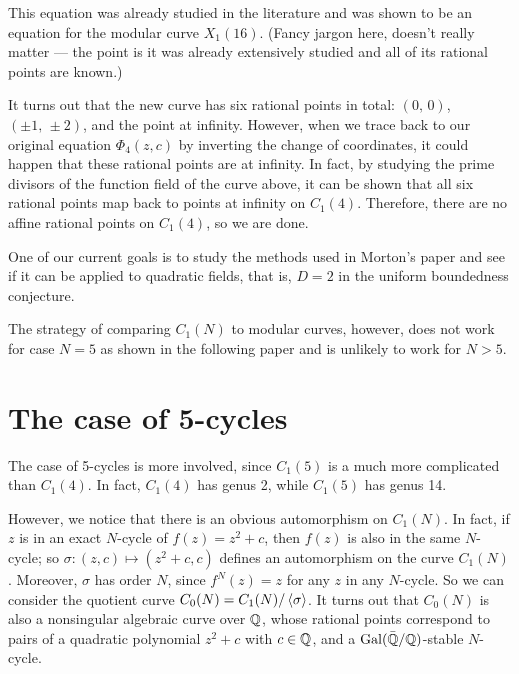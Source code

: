 This equation was already studied in the literature and was shown to
be an equation for the modular curve $X_1(16)$. (Fancy jargon here,
doesn't really matter --- the point is it was already extensively
studied and all of its rational points are known.)

It turns out that the new curve has six rational points in total:
$(0,\, 0)$, $(\pm 1,\, \pm 2)$, and the point at infinity. However,
when we trace back to our original equation $\Phi_4(z, c)$ by
inverting the change of coordinates, it could happen that these
rational points are at infinity. In fact, by studying the prime
divisors of the function field of the curve above, it can be shown
that all six rational points map back to points at infinity on
$C_1(4)$. Therefore, there are no affine rational points on $C_1(4)$,
so we are done.

\begin{remark}
  One of our current goals is to study the methods used in Morton's
  paper and see if it can be applied to quadratic fields, that is, $D
  = 2$ in the uniform boundedness conjecture.
\end{remark}

\begin{remark}
  The strategy of comparing $C_1(N)$ to modular curves, however, does
  not work for case $N = 5$ as shown in the following paper and is
  unlikely to work for $N > 5$.
\end{remark}



\section{The case of 5-cycles}

The case of 5-cycles is more involved, since $C_1(5)$ is a much more
complicated than $C_1(4)$. In fact, $C_1(4)$ has genus 2, while
$C_1(5)$ has genus 14.

However, we notice that there is an obvious automorphism on
$C_1(N)$. In fact, if $z$ is in an exact $N$-cycle of $f(z) = z^2 +
c$, then $f(z)$ is also in the same $N$-cycle; so $\sigma: (z, c)
\mapsto (z^2 + c, c)$ defines an automorphism on the curve
$C_1(N)$. Moreover, $\sigma$ has order $N$, since $f^N(z) = z$ for any
$z$ in any $N$-cycle. So we can consider the quotient curve $C_0(N) =
C_1(N)/\left<\sigma\right>$. It turns out that $C_0(N)$ is also a nonsingular
algebraic curve over $\mathbb{Q}$, whose rational points correspond to pairs
of a quadratic polynomial $z^2 + c$ with $c \in \mathbb{Q}$, and a
$\mathrm{Gal}(\bar{\mathbb{Q}}/\mathbb{Q})$-stable $N$-cycle.

